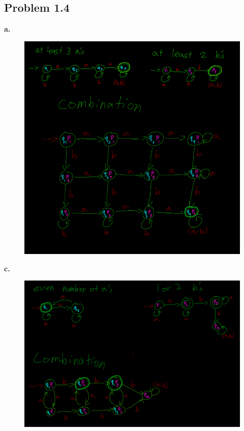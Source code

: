 \documentclass[letter]{article}
\theoremstyle{case}
\begin{document}
\newpage

\subsection*{Problem 1.4}
\textbf{a.}
\begin{figure}[h!]
	\includegraphics[scale=0.4]{4a.png}
\end{figure} 

\textbf{c.} 
\begin{figure}[h!]
	\includegraphics[scale=0.4]{4c.png}
\end{figure} 
\end{document}
